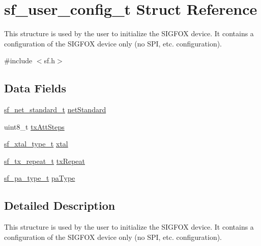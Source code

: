 \hypertarget{structsf__user__config__t}{}\section{sf\+\_\+user\+\_\+config\+\_\+t Struct Reference}
\label{structsf__user__config__t}


This structure is used by the user to initialize the S\+I\+G\+F\+OX device. It contains a configuration of the S\+I\+G\+F\+OX device only (no S\+PI, etc. configuration).  




{\ttfamily \#include $<$sf.\+h$>$}

\subsection*{Data Fields}
\begin{DoxyCompactItemize}
\item 
\mbox{\hyperlink{group__sf__enum__group_ga9ad07e4b666d7d70f7a69614ecb89421}{sf\+\_\+net\+\_\+standard\+\_\+t}} \mbox{\hyperlink{structsf__user__config__t_ab90aa96aca46c0b99f92de71ca11d792}{net\+Standard}}
\item 
uint8\+\_\+t \mbox{\hyperlink{structsf__user__config__t_ab9629fb6d8a7c0cbe42b58030e087e94}{tx\+Att\+Steps}}
\item 
\mbox{\hyperlink{group__sf__enum__group_ga921cd8c6964917cde98f2a132c5548d5}{sf\+\_\+xtal\+\_\+type\+\_\+t}} \mbox{\hyperlink{structsf__user__config__t_a39dc4132c306ddfd5c953d25ec462e82}{xtal}}
\item 
\mbox{\hyperlink{group__sf__enum__group_ga7d2f06984784542a95d02e422a42d9cf}{sf\+\_\+tx\+\_\+repeat\+\_\+t}} \mbox{\hyperlink{structsf__user__config__t_ac3c47b91470c93e7ddee7c38182cc50c}{tx\+Repeat}}
\item 
\mbox{\hyperlink{group__sf__enum__group_gac746e971077ef8c8dac9d26a8b47a2f9}{sf\+\_\+pa\+\_\+type\+\_\+t}} \mbox{\hyperlink{structsf__user__config__t_a690c474c8cd0d99898f711b187fbef43}{pa\+Type}}
\end{DoxyCompactItemize}


\subsection{Detailed Description}
This structure is used by the user to initialize the S\+I\+G\+F\+OX device. It contains a configuration of the S\+I\+G\+F\+OX device only (no S\+PI, etc. configuration). 

